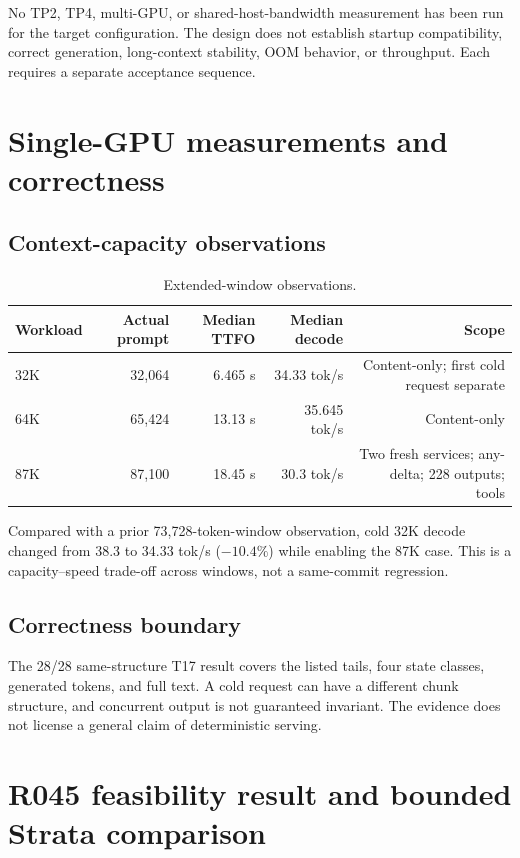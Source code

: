 \documentclass[11pt]{article}
\begin{document}
No TP2, TP4, multi-GPU, or shared-host-bandwidth measurement has been run for the target configuration. The design does not establish startup compatibility, correct generation, long-context stability, OOM behavior, or throughput. Each requires a separate acceptance sequence.

\section{Single-GPU measurements and correctness}

\subsection{Context-capacity observations}

\begin{table}[t]
\centering
\small
\begin{tabular}{lrrrr}
\toprule
Workload & Actual prompt & Median TTFO & Median decode & Scope \\
\midrule
32K & 32,064 & 6.465 s & 34.33 tok/s & Content-only; first cold request separate \\
64K & 65,424 & 13.13 s & 35.645 tok/s & Content-only \\
87K & 87,100 & 18.45 s & 30.3 tok/s & Two fresh services; any-delta; 228 outputs; tools \\
\bottomrule
\end{tabular}
\caption{Extended-window observations.}
\label{tab:capacity}
\end{table}

Compared with a prior 73,728-token-window observation, cold 32K decode changed from 38.3 to 34.33 tok/s ($-10.4\%$) while enabling the 87K case. This is a capacity--speed trade-off across windows, not a same-commit regression.

\subsection{Correctness boundary}

The 28/28 same-structure T17 result covers the listed tails, four state classes, generated tokens, and full text. A cold request can have a different chunk structure, and concurrent output is not guaranteed invariant. The evidence does not license a general claim of deterministic serving.

\section{R045 feasibility result and bounded Strata comparison}
\end{document}
